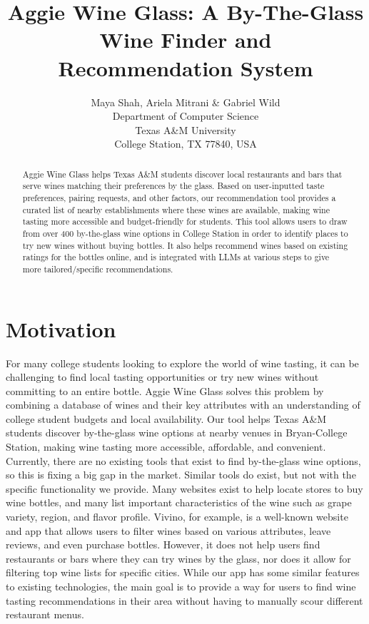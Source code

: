 \documentclass{article} %
\title{Aggie Wine Glass: A By-The-Glass Wine Finder and \\ Recommendation System}
\author{Maya Shah, Ariela Mitrani \& Gabriel Wild\\
Department of Computer Science\\
Texas A\&M University\\
College Station, TX 77840, USA \\
}
\begin{document}
\ifcolmsubmission
\linenumbers
\fi

\maketitle

\begin{abstract}

Aggie Wine Glass helps Texas A\&M students discover local restaurants and bars that serve wines matching their preferences by the glass. Based on user-inputted taste preferences, pairing requests, and other factors, our recommendation tool provides a curated list of nearby establishments where these wines are available, making wine tasting more accessible and budget-friendly for students. This tool allows users to draw from over 400 by-the-glass wine options in College Station in order to identify places to try new wines without buying bottles. It also helps recommend wines based on existing ratings for the bottles online, and is integrated with LLMs at various steps to give more tailored/specific recommendations.

\end{abstract}

\section{Motivation}

For many college students looking to explore the world of wine tasting, it can be challenging to find local tasting opportunities or try new wines without committing to an entire bottle. Aggie Wine Glass solves this problem by combining a database of wines and their key attributes with an understanding of college student budgets and local availability. Our tool helps Texas A\&M students discover by-the-glass wine options at nearby venues in Bryan-College Station, making wine tasting more accessible, affordable, and convenient. Currently, there are no existing tools that exist to find by-the-glass wine options, so this is fixing a big gap in the market. Similar tools do exist, but not with the specific functionality we provide. Many websites exist to help locate stores to buy wine bottles, and many list important characteristics of the wine such as grape variety, region, and flavor profile. Vivino, for example, is a well-known website and app that allows users to filter wines based on various attributes, leave reviews, and even purchase bottles. However, it does not help users find restaurants or bars where they can try wines by the glass, nor does it allow for filtering top wine lists for specific cities. While our app has some similar features to existing technologies, the main goal is to provide a way for users to find wine tasting recommendations in their area without having to manually scour different restaurant menus. 
\end{document}
